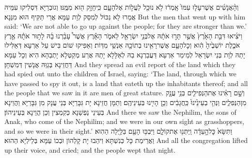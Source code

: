 {וְהָ֨אֲנָשִׁ֜ים אֲשֶׁר\maqqaf עָל֤וּ עִמּוֹ֙ אָֽמְר֔וּ לֹ֥א נוּכַ֖ל לַעֲל֣וֹת אֶל\maqqaf הָעָ֑ם כִּֽי\maqqaf חָזָ֥ק ה֖וּא מִמֶּֽנּוּ׃}
{וְגוּבְרַיָּא דִּסְלִיקוּ עִמֵּיהּ אֲמַרוּ לָא נִכּוֹל לְמִסַּק לְוָת עַמָּא אֲרֵי תַּקִּיף הוּא מִנַּנָא׃}
{But the men that went up with him said: ‘We are not able to go up against the people; for they are stronger than we.’}{}
{וַיֹּצִ֜יאוּ דִּבַּ֤ת הָאָ֙רֶץ֙ אֲשֶׁ֣ר תָּר֣וּ אֹתָ֔הּ אֶל\maqqaf בְּנֵ֥י יִשְׂרָאֵ֖ל לֵאמֹ֑ר הָאָ֡רֶץ אֲשֶׁר֩ עָבַ֨רְנוּ בָ֜הּ לָת֣וּר אֹתָ֗הּ אֶ֣רֶץ אֹכֶ֤לֶת יוֹשְׁבֶ֙יהָ֙ הִ֔וא וְכׇל\maqqaf הָעָ֛ם אֲשֶׁר\maqqaf רָאִ֥ינוּ בְתוֹכָ֖הּ אַנְשֵׁ֥י מִדּֽוֹת׃}
{וְאַפִּיקוּ שׁוֹם בִּישׁ עַל אַרְעָא דְּאַלִּילוּ יָתַהּ לְוָת בְּנֵי יִשְׂרָאֵל לְמֵימַר אַרְעָא דַּעֲבַרְנָא בַהּ לְאַלָּלָא יָתַהּ אֲרַע מְקַטְּלָא יָתְבַהָא הִיא וְכָל עַמָּא דַּחֲזֵינָא בְּגַוַּהּ אֲנָשִׁין דְּמִשְׁחָן׃}
{And they spread an evil report of the land which they had spied out unto the children of Israel, saying: ‘The land, through which we have passed to spy it out, is a land that eateth up the inhabitants thereof; and all the people that we saw in it are men of great stature.}{}
{וְשָׁ֣ם רָאִ֗ינוּ אֶת\maqqaf הַנְּפִילִ֛ים בְּנֵ֥י עֲנָ֖ק מִן\maqqaf הַנְּפִלִ֑ים וַנְּהִ֤י בְעֵינֵ֙ינוּ֙ כַּֽחֲגָבִ֔ים וְכֵ֥ן הָיִ֖ינוּ בְּעֵינֵיהֶֽם׃}
{וְתַמָּן חֲזֵינָא יָת גִּבָּרַיָּא בְּנֵי עֲנָק מִן גִּבָּרַיָּא וַהֲוֵינָא בְּעֵינֵי נַפְשַׁנָא כְּקִמְצִין וְכֵן הֲוֵינָא בְּעֵינֵיהוֹן׃}
{And there we saw the Nephilim, the sons of Anak, who come of the Nephilim; and we were in our own sight as grasshoppers, and so we were in their sight.’}{}
\newperek
{}%
{וַתִּשָּׂא֙ כׇּל\maqqaf הָ֣עֵדָ֔ה וַֽיִּתְּנ֖וּ אֶת\maqqaf קוֹלָ֑ם וַיִּבְכּ֥וּ הָעָ֖ם בַּלַּ֥יְלָה הַהֽוּא׃}
{וַאֲרֵימַת כָּל כְּנִשְׁתָּא וִיהַבוּ יָת קָלְהוֹן וּבְכוֹ עַמָּא בְּלֵילְיָא הַהוּא׃}
{And all the congregation lifted up their voice, and cried; and the people wept that night.}{}
